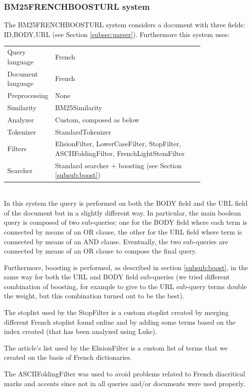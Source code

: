 \subsubsection{BM25FRENCHBOOSTURL system}
\label{subsub:BM25FRENCHBOOSTURL}
The BM25FRENCHBOOSTURL system considers a document with three fields: ID,BODY,URL (see Section \ref{subsec:parser}). Furthermore this system uses:
\begin{table}[h!]
    \centering
    \begin{tabular}{l p{0.8\linewidth}}
    Query language & French\\
    Document language & French\\
    Preprocessing & None\\
    Similarity & BM25Similarity\\
    Analyzer & Custom, composed as below\\
    Tokenizer & StandardTokenizer\\
    Filters & ElisionFilter, LowerCaseFilter, StopFilter, ASCIIFoldingFilter, FrenchLightStemFilter\\
    Searcher & Standard searcher + boosting (see Section \ref{subsub:boost})
    \end{tabular}
\end{table}
\\
In this system the query is performed on both the BODY field and the URL field of the document but in a slightly different way. In particular, the main boolean query is composed of two sub-queries: one for the BODY field where each term is connected by means of an OR clause, the other for the URL field where term is connected by means of an AND clause. Eventually, the two sub-queries are connected by means of an OR clause to compose the final query.
\par
Furthermore, boosting is performed, as described in section \ref{subsub:boost}, in the same way for both the URL and BODY field sub-queries (we tried different combination of boosting, for example to give to the URL sub-query terms double the weight, but this combination turned out to be the best).
\par
The stoplist used by the StopFilter is a custom stoplist created by merging different French stoplist found online and by adding some terms based on the index created (that has been analyzed using Luke).
\par 
The article's list used by the ElisionFilter is a custom list of terms that we created on the basis of French dictionaries. 
\par
The ASCIIFoldingFilter was used to avoid problems related to French diacritical marks and accents since not in all queries and/or documents were used properly.

